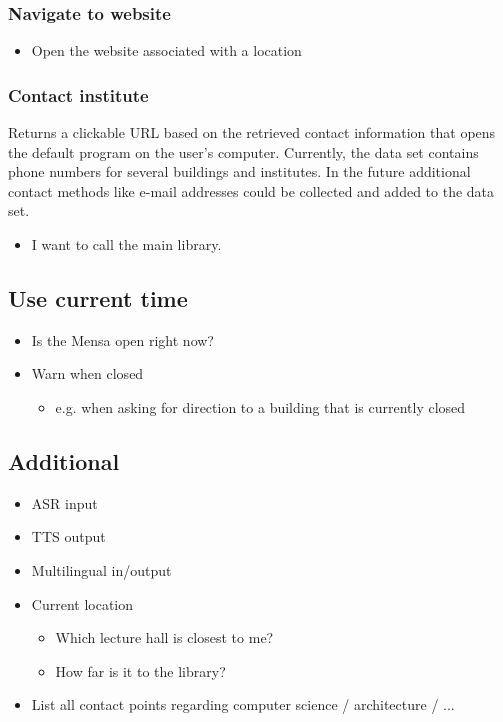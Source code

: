 \documentclass{article}
\begin{document}
\subsubsection{Navigate to website}
  \begin{itemize}
  \item Open the website associated with a location
  \end{itemize}

\subsubsection{Contact institute}
Returns a clickable URL based on the retrieved contact information that opens the default program on the user's computer. Currently, the data set contains phone numbers for several buildings and institutes. In the future additional contact methods like e-mail addresses could be collected and added to the data set.
  \begin{itemize}
  \item I want to call the main library.
  \end{itemize}

\subsection{Use current time}
  \begin{itemize}
  \item Is the Mensa open right now?
    \item Warn when closed
      \begin{itemize}
      \item e.g. when asking for direction to a building that is currently closed
      \end{itemize}
  \end{itemize}

\subsection{Additional}
\begin{itemize}
    \item ASR input
    \item TTS output
    \item Multilingual in/output
    \item Current location
        \begin{itemize}
        \item Which lecture hall is closest to me?
        \item How far is it to the library?
        \end{itemize}
    \item List all contact points regarding computer science / architecture / ...
\end{itemize}
\end{document}
